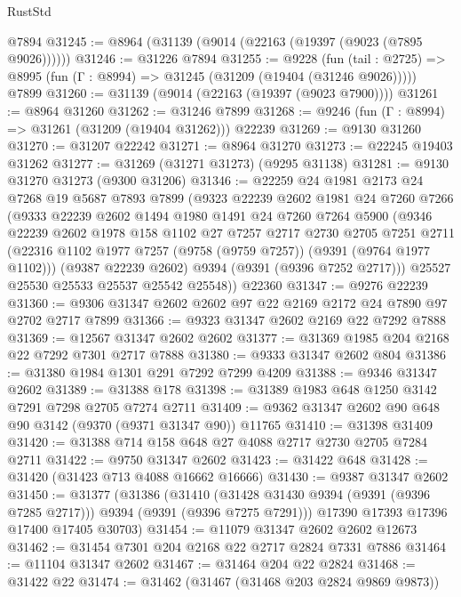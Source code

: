 \begin{lexlean}{RustStd}
\begin{coremodule}
    @7894
@31245 := @8964 (@31139 (@9014 (@22163 (@19397 (@9023 (@7895 @9026))))))
@31246 := @31226 @7894
@31255 := @9228
    (fun (tail : @2725) => @8995 (fun (Γ : @8994) => @31245 (@31209 (@19404 (@31246 @9026)))))
    @7899
@31260 := @31139 (@9014 (@22163 (@19397 (@9023 @7900))))
@31261 := @8964 @31260
@31262 := @31246 @7899
@31268 := @9246 (fun (Γ : @8994) => @31261 (@31209 (@19404 @31262))) @22239
@31269 := @9130 @31260
@31270 := @31207 @22242
@31271 := @8964 @31270
@31273 := @22245 @19403 @31262
@31277 := @31269 (@31271 @31273) (@9295 @31138)
@31281 := @9130 @31270 @31273 (@9300 @31206)
@31346 := @22259
    @24
    @1981
    @2173
    @24
    @7268
    @19
    @5687
    @7893
    @7899
    (@9323
      @22239
      @2602
      @1981
      @24
      @7260
      @7266
      (@9333
        @22239
        @2602
        @1494
        @1980
        @1491
        @24
        @7260
        @7264
        @5900
        (@9346
          @22239
          @2602
          @1978
          @158
          @1102
          @27
          @7257
          @2717
          @2730
          @2705
          @7251
          @2711
          (@22316 @1102 @1977 @7257 (@9758 (@9759 @7257)) (@9391 (@9764 @1977 @1102)))
          (@9387 @22239 @2602)
          @9394
          (@9391 (@9396 @7252 @2717)))
        @25527
        @25530
        @25533
        @25537
        @25542
        @25548))
    @22360
@31347 := @9276 @22239
@31360 := @9306 @31347 @2602 @2602 @97 @22 @2169 @2172 @24 @7890 @97 @2702 @2717 @7899
@31366 := @9323 @31347 @2602 @2169 @22 @7292 @7888
@31369 := @12567 @31347 @2602 @2602
@31377 := @31369 @1985 @204 @2168 @22 @7292 @7301 @2717 @7888
@31380 := @9333 @31347 @2602 @804
@31386 := @31380 @1984 @1301 @291 @7292 @7299 @4209
@31388 := @9346 @31347 @2602
@31389 := @31388 @178
@31398 := @31389 @1983 @648 @1250 @3142 @7291 @7298 @2705 @7274 @2711
@31409 := @9362 @31347 @2602 @90 @648 @90 @3142 (@9370 (@9371 @31347 @90)) @11765
@31410 := @31398 @31409
@31420 := @31388 @714 @158 @648 @27 @4088 @2717 @2730 @2705 @7284 @2711
@31422 := @9750 @31347 @2602
@31423 := @31422 @648
@31428 := @31420 (@31423 @713 @4088 @16662 @16666)
@31430 := @9387 @31347 @2602
@31450 := @31377
    (@31386
      (@31410 (@31428 @31430 @9394 (@9391 (@9396 @7285 @2717))) @9394 (@9391 (@9396 @7275 @7291)))
      @17390
      @17393
      @17396
      @17400
      @17405
      @30703)
@31454 := @11079 @31347 @2602 @2602 @12673
@31462 := @31454 @7301 @204 @2168 @22 @2717 @2824 @7331 @7886
@31464 := @11104 @31347 @2602
@31467 := @31464 @204 @22 @2824
@31468 := @31422 @22
@31474 := @31462 (@31467 (@31468 @203 @2824 @9869 @9873))

\end{coremodule}
\end{lexlean}
